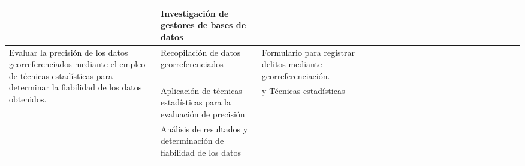 \begin{landscape}
\begin{ThreePartTable}
\begin{longtable}{|p{}|p{5.5cm}|p{4cm}|l|l|l|l|l|l|l|l|l|l|l|l|l|l|l|l|l|l|l|}
            \cline{2-2}\cline{4-21}
                                                                                & Investigación de gestores de bases de datos                         &                                                                &                                       & \cellcolor{green!25}                  &                                      &                                       &                      &                      &                      &                      &                      &                      &                      &                      &                      &                      &                      \\
            \hline
            \multirow{4}{0.41\textwidth}{Evaluar la precisión de los datos georreferenciados mediante el empleo de técnicas
            estadísticas para determinar la fiabilidad de los datos obtenidos.} & Recopilación de datos georreferenciados                             & Formulario para registrar delitos mediante georreferenciación. &                                       &                                       & \cellcolor{green!25}                 & \cellcolor{green!25}                  & \cellcolor{green!25} & \cellcolor{green!25} & \cellcolor{green!25} & \cellcolor{green!25} & \cellcolor{green!25} & \cellcolor{green!25} & \cellcolor{green!25} &                      &                      &                      &                      \\
            \cline{2-2}\cline{4-21}
                                                                                & Aplicación de técnicas estadísticas para la evaluación de precisión & y Técnicas estadísticas                                        &                                       &                                       &                                      &                                       &                      &                      &                      &                      &                      &                      &                      & \cellcolor{green!25} &                      &                      &                      \\
            \cline{2-2}\cline{4-21}
                                                                                & Análisis de resultados y determinación de fiabilidad de los datos   &                                                                &                                       &                                       &                                      &                                       &                      &                      &                      &                      &                      &                      &                      & \cellcolor{green!25} &                      &                      &                      \\

\end{longtable}
\end{ThreePartTable}
\end{landscape}
